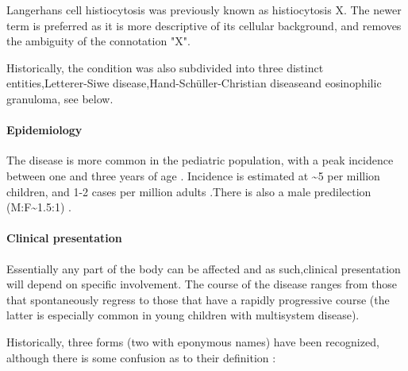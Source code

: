 Langerhans cell histiocytosis was previously known as histiocytosis X. The newer term is preferred as it is more descriptive of its cellular background, and removes the ambiguity of the connotation "X".

Historically, the condition was also subdivided into three distinct entities,Letterer-Siwe disease,Hand-Schüller-Christian diseaseand eosinophilic granuloma, see below.

\paragraph{Epidemiology}

The disease is more common in the pediatric population, with a peak incidence between one and three years of age . Incidence is estimated at \textasciitilde5 per million children, and 1-2 cases per million adults .There is also a male predilection (M:F\textasciitilde1.5:1) .

\paragraph{Clinical presentation}

Essentially any part of the body can be affected and as such,clinical presentation will depend on specific involvement. The course of the disease ranges from those that spontaneously regress to those that have a rapidly progressive course (the latter is especially common in young children with multisystem disease).

Historically, three forms (two with eponymous names) have been recognized, although there is some confusion as to their definition :

